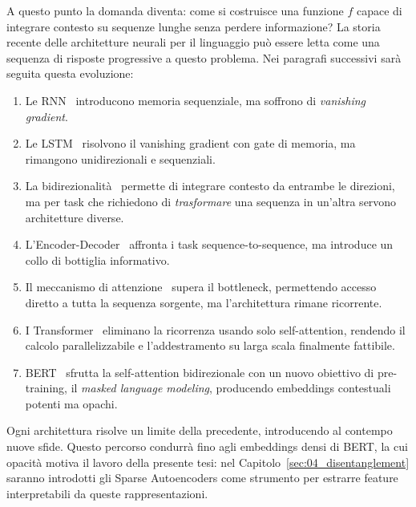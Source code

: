 A questo punto la domanda diventa: come si costruisce una funzione $f$ capace di integrare contesto su sequenze lunghe senza perdere informazione? La storia recente delle architetture neurali per il linguaggio può essere letta come una sequenza di risposte progressive a questo problema. Nei paragrafi successivi sarà seguita questa evoluzione:
\begin{enumerate}
    \item Le RNN~\parencite{elman1990finding} introducono memoria sequenziale, ma soffrono di \textit{vanishing gradient}.
    \item Le LSTM~\parencite{hochreiter1997long} risolvono il vanishing gradient con gate di memoria, ma rimangono unidirezionali e sequenziali.
    \item La bidirezionalità~\parencite{schuster1997bidirectional} permette di integrare contesto da entrambe le direzioni, ma per task che richiedono di \textit{trasformare} una sequenza in un'altra servono architetture diverse.
    \item L'Encoder-Decoder~\parencite{sutskever2014sequence} affronta i task sequence-to-sequence, ma introduce un collo di bottiglia informativo.
    \item Il meccanismo di attenzione~\parencite{bahdanau2014neural} supera il bottleneck, permettendo accesso diretto a tutta la sequenza sorgente, ma l'architettura rimane ricorrente.
    \item I Transformer~\parencite{vaswani2017attention} eliminano la ricorrenza usando solo self-attention, rendendo il calcolo parallelizzabile e l'addestramento su larga scala finalmente fattibile.
    \item BERT~\parencite{devlin2018bert} sfrutta la self-attention bidirezionale con un nuovo obiettivo di pre-training, il \textit{masked language modeling}, producendo embeddings contestuali potenti ma opachi.
\end{enumerate}
Ogni architettura risolve un limite della precedente, introducendo al contempo nuove sfide. Questo percorso condurrà fino agli embeddings densi di BERT, la cui opacità motiva il lavoro della presente tesi: nel Capitolo~\ref{sec:04_disentanglement} saranno introdotti gli Sparse Autoencoders come strumento per estrarre feature interpretabili da queste rappresentazioni.



